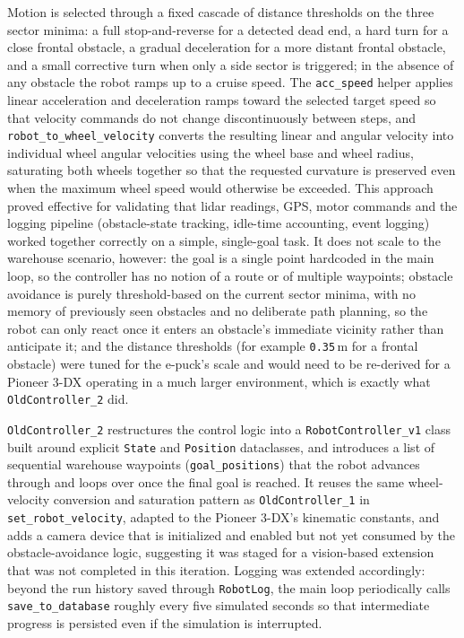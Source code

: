 Motion is selected through a fixed cascade of distance thresholds on the three sector minima: a full stop-and-reverse for a detected dead end, a hard turn for a close frontal obstacle, a gradual deceleration for a more distant frontal obstacle, and a small corrective turn when only a side sector is triggered; in the absence of any obstacle the robot ramps up to a cruise speed. The \texttt{acc\_speed} helper applies linear acceleration and deceleration ramps toward the selected target speed so that velocity commands do not change discontinuously between steps, and \texttt{robot\_to\_wheel\_velocity} converts the resulting linear and angular velocity into individual wheel angular velocities using the wheel base and wheel radius, saturating both wheels together so that the requested curvature is preserved even when the maximum wheel speed would otherwise be exceeded. This approach proved effective for validating that lidar readings, GPS, motor commands and the logging pipeline (obstacle-state tracking, idle-time accounting, event logging) worked together correctly on a simple, single-goal task. It does not scale to the warehouse scenario, however: the goal is a single point hardcoded in the main loop, so the controller has no notion of a route or of multiple waypoints; obstacle avoidance is purely threshold-based on the current sector minima, with no memory of previously seen obstacles and no deliberate path planning, so the robot can only react once it enters an obstacle's immediate vicinity rather than anticipate it; and the distance thresholds (for example \texttt{0.35}\,m for a frontal obstacle) were tuned for the e-puck's scale and would need to be re-derived for a Pioneer 3-DX operating in a much larger environment, which is exactly what \texttt{OldController\_2} did.

\texttt{OldController\_2} restructures the control logic into a \texttt{RobotController\_v1} class built around explicit \texttt{State} and \texttt{Position} dataclasses, and introduces a list of sequential warehouse waypoints (\texttt{goal\_positions}) that the robot advances through and loops over once the final goal is reached. It reuses the same wheel-velocity conversion and saturation pattern as \texttt{OldController\_1} in \texttt{set\_robot\_velocity}, adapted to the Pioneer 3-DX's kinematic constants, and adds a camera device that is initialized and enabled but not yet consumed by the obstacle-avoidance logic, suggesting it was staged for a vision-based extension that was not completed in this iteration. Logging was extended accordingly: beyond the run history saved through \texttt{RobotLog}, the main loop periodically calls \texttt{save\_to\_database} roughly every five simulated seconds so that intermediate progress is persisted even if the simulation is interrupted.


